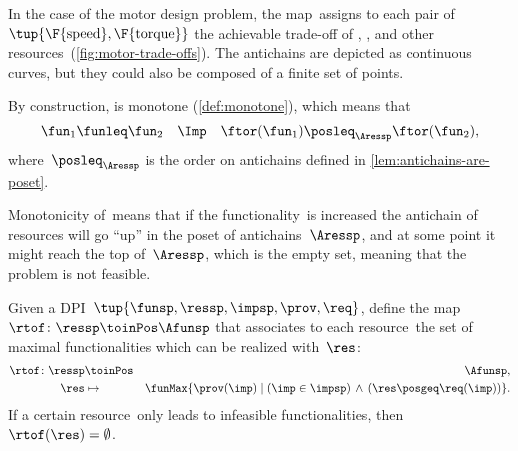 \begin{example}
  In the case of the motor design problem, the map~\ftor assigns
  to each pair of~$\tup{\F{\text{speed}},\F{\text{torque}}}$
  the achievable trade-off of , , and other resources~(\cref{fig:motor-trade-offs}).
  The antichains are depicted as continuous curves, but they could also
  be composed of a finite set of points.

\end{example}


By construction, \ftor is monotone (\cref{def:monotone}), which means that
\begin{equation*}
  \fun_{1}\funleq\fun_{2}\quad\Imp\quad\ftor(\fun_{1})\posleq_{\Aressp}\ftor(\fun_{2}),
\end{equation*}
where~$\posleq_{\Aressp}$ is the order on antichains defined in \cref{lem:antichains-are-poset}.

Monotonicity of~\ftor means that if the functionality~\fun is increased the antichain of resources will go ``up'' in the poset of antichains~$\Aressp$,
and at some point it might reach the top of~$\Aressp$, which is the empty set, meaning that the problem is not feasible.


\begin{definition}
  \label{def:rtof}
  Given a DPI~$\tup{ \funsp,\ressp,\impsp,\prov,\req}$,
  define the map~$\rtof\colon \ressp\toinPos \Afunsp$ that associates
  to each resource~\res the set of maximal functionalities which can be realized with~$\res$:
  \begin{eqnarray*}
    \rtof\colon \ressp & \toinPos & \Afunsp,\\
    \res& \mapsto & \funMax\{\prov(\imp)\mid\left(\imp\in\impsp\right)\,\wedge\,\left(\res\posgeq\req(\imp)\right)\}.
  \end{eqnarray*}
  If a certain resource~\res only leads to infeasible functionalities, then~$\rtof(\res)=\emptyset$.
\end{definition}


